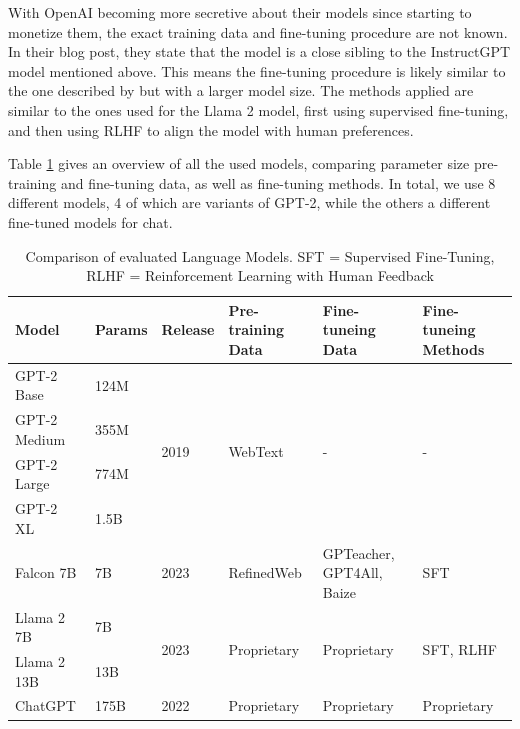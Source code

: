 With OpenAI becoming more secretive about their models since starting to monetize them, the exact training data and fine-tuning procedure are not known.
In their blog post, they state that the model is a close sibling to the InstructGPT model mentioned above.
This means the fine-tuning procedure is likely similar to the one described by \cite{ouyang:2022:Training} but with a larger model size.
The methods applied are similar to the ones used for the Llama 2 model, first using supervised fine-tuning, and then using RLHF to align the model with human preferences.


Table \ref{tab:language-models} gives an overview of all the used models, comparing parameter size pre-training and fine-tuning data, as well as fine-tuning methods.
In total, we use 8 different models, 4 of which are variants of GPT-2, while the others a different fine-tuned models for chat.
\begin{table}[tb]
\centering
\begin{tabularx}{\textwidth}{lllXXX}
\hline
\textbf{Model} & \textbf{Params} & \textbf{Release} & \textbf{Pre-training Data} & \textbf{Fine-tuneing Data} & \textbf{Fine-tuneing Methods} \\
\hline
GPT-2 Base    & 124M & \multirow{4}{*}{2019} & \multirow{4}{*}{WebText} & \multirow{4}{*}{-} & \multirow{4}{*}{-} \\
GPT-2 Medium  & 355M &                      &                          &  &  \\
GPT-2 Large   & 774M &                      &                          &  &  \\
GPT-2 XL      & 1.5B &                      &                          &  &  \\
\hline
Falcon 7B              & 7B      & 2023 & RefinedWeb           & GPTeacher, GPT4All, Baize & SFT \\
\hline
Llama 2 7B & 7B    & \multirow{2}{*}{2023} & \multirow{2}{*}{Proprietary} & \multirow{2}{*}{Proprietary} & \multirow{2}{*}{SFT, RLHF} \\
Llama 2 13B   & 13B   &  &                        &                         &  \\
\hline
ChatGPT                & 175B   & 2022 & Proprietary                & Proprietary & Proprietary \\
\hline
\end{tabularx}
\caption{Comparison of evaluated Language Models. SFT = Supervised Fine-Tuning, RLHF = Reinforcement Learning with Human Feedback}\label{tab:language-models}
\end{table}

